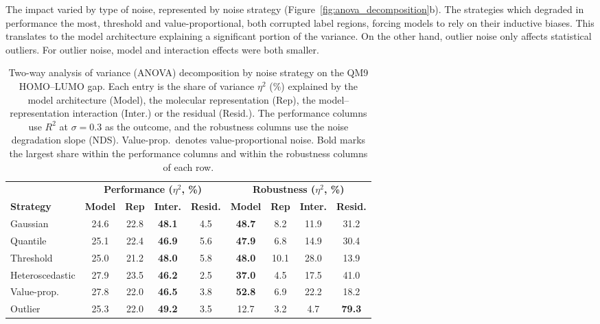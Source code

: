The impact varied by type of noise, represented by noise strategy (Figure~\ref{fig:anova_decomposition}b). The strategies which degraded in performance the most, threshold and value-proportional, both corrupted label regions, forcing models to rely on their inductive biases. This translates to the model architecture explaining a significant portion of the variance. On the other hand, outlier noise only affects statistical outliers. For outlier noise, model and interaction effects were both smaller.

\begin{table}[htbp]
\centering
\caption[ANOVA variance decomposition by noise strategy on QM9.]{Two-way analysis of variance (ANOVA) decomposition by noise strategy on the QM9 HOMO--LUMO gap. Each entry is the share of variance $\eta^2$ (\%) explained by the model architecture (Model), the molecular representation (Rep), the model--representation interaction (Inter.) or the residual (Resid.). The performance columns use $R^2$ at $\sigma = 0.3$ as the outcome, and the robustness columns use the noise degradation slope (NDS). Value-prop.\ denotes value-proportional noise. Bold marks the largest share within the performance columns and within the robustness columns of each row.}
\label{tab:anova_decomposition}
\small
\begin{adjustbox}{max width=\textwidth}
\begin{tabular}{lcccccccc}
\toprule
& \multicolumn{4}{c}{\textbf{Performance ($\eta^2$, \%)}} & \multicolumn{4}{c}{\textbf{Robustness ($\eta^2$, \%)}} \\
\cmidrule(lr){2-5} \cmidrule(lr){6-9}
\textbf{Strategy} & \textbf{Model} & \textbf{Rep} & \textbf{Inter.} & \textbf{Resid.} & \textbf{Model} & \textbf{Rep} & \textbf{Inter.} & \textbf{Resid.} \\
\midrule
Gaussian        & 24.6 & 22.8 & \textbf{48.1} &  4.5 & \textbf{48.7} &  8.2 & 11.9 & 31.2 \\
Quantile        & 25.1 & 22.4 & \textbf{46.9} &  5.6 & \textbf{47.9} &  6.8 & 14.9 & 30.4 \\
Threshold       & 25.0 & 21.2 & \textbf{48.0} &  5.8 & \textbf{48.0} & 10.1 & 28.0 & 13.9 \\
Heteroscedastic & 27.9 & 23.5 & \textbf{46.2} &  2.5 & \textbf{37.0} &  4.5 & 17.5 & 41.0 \\
Value-prop.     & 27.8 & 22.0 & \textbf{46.5} &  3.8 & \textbf{52.8} &  6.9 & 22.2 & 18.2 \\
Outlier         & 25.3 & 22.0 & \textbf{49.2} &  3.5 & 12.7 &  3.2 &  4.7 & \textbf{79.3} \\
\bottomrule
\end{tabular}
\end{adjustbox}
\end{table}

